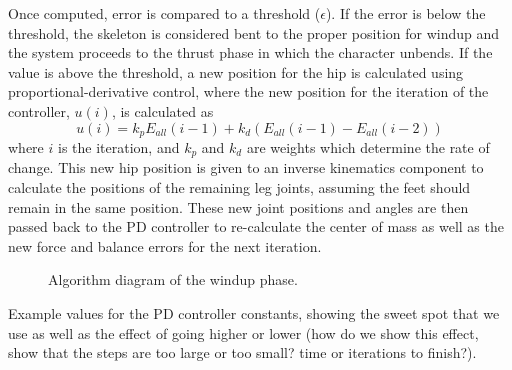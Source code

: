 Once computed, error is compared to a threshold ($\epsilon$).  If the error is below the threshold, the skeleton is considered bent to the proper position for windup and the system proceeds to the thrust phase in which the character unbends.  If the value is above the threshold, a new position for the hip is calculated using proportional-derivative control, where the new position for the iteration of the controller, $u(i)$, is calculated as \[u(i) = k_p E_{all}(i - 1) + k_d(E_{all}(i-1) - E_{all}(i-2))\] where $i$ is the iteration, and $k_p$ and $k_d$ are weights which determine the rate of change. This new hip position is given to an inverse kinematics component to calculate the positions of the remaining leg joints, assuming the feet should remain in the same position.  These new joint positions and angles are then passed back to the PD controller to re-calculate the center of mass as well as the new force and balance errors for the next iteration.

\begin{figure}[ht]
	\centering
	\resizebox{\textwidth}{!}{
		
	}
	\caption[Diagram of windup phase algorithm]{Algorithm diagram of the windup phase.}
	\label{fig:bendPhase}
\end{figure}

\begin{table}[ht]
	\centering
	\caption[Table of PD controller constants for windup phase]{Example values for the PD controller constants, showing the sweet spot that we use as well as the effect of going higher or lower (how do we show this effect, show that the steps are too large or too small? time or iterations to finish?).}
	\label{tab:windup_pd_vals}
\end{table}

